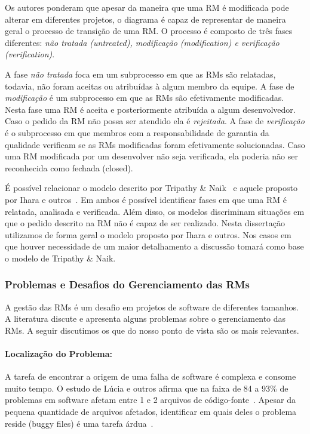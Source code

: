 Os autores ponderam que apesar da maneira que uma RM é modificada pode alterar
em diferentes projetos, o diagrama é capaz de representar de maneira geral o
processo de transição de uma RM\@. O processo é composto de três fases
diferentes: \textit{não tratada (untreated), modificação (modification) e
    verificação (verification)}.

A fase \textit{não tratada} foca em um subprocesso em que as RMs são relatadas,
todavia, não foram aceitas ou atribuídas à algum membro da equipe. A fase de
\textit{modificação} é um subprocesso em que as RMs são efetivamente modificadas.
Nesta fase uma RM é aceita e posteriormente atribuída a algum desenvolvedor.
Caso o pedido da RM não possa ser atendido ela é \textit{rejeitada}.  A fase de
\textit{verificação} é o subprocesso em que membros com a responsabilidade de
garantia da qualidade verificam se as RMs modificadas foram efetivamente
solucionadas. Caso uma RM modificada por um desenvolver não seja verificada, ela
poderia não ser reconhecida como fechada (closed).

É possível relacionar o modelo descrito por Tripathy \&
Naik~\cite{tripathy2014software} e aquele proposto por Ihara e
outros~\cite{ihara2009analysis}. Em ambos é possível identificar fases em que uma
RM é relatada, analisada e verificada. Além disso, os modelos discriminam
situações em que o pedido descrito na RM não é capaz de ser realizado. Nesta
dissertação utilizamos de forma geral o modelo proposto por Ihara e outros. Nos
casos em que houver necessidade de um maior detalhamento a discussão tomará como
base o modelo de Tripathy \& Naik.

\subsubsection{Problemas e Desafios do Gerenciamento das RMs}
\label{ssub:problemas_relacionadas_rm}

A gestão das RMs é um desafio em projetos de software de diferentes tamanhos. A
literatura discute e apresenta alguns problemas sobre o gerenciamento das RMs. A
seguir discutimos os que do nosso ponto de vista são os mais relevantes.

\paragraph{Localização do Problema:}

A tarefa de encontrar a origem de uma falha de software é complexa e consome
muito tempo. O estudo de Lúcia e outros afirma que na faixa de 84 a 93\% de
problemas em software afetam entre 1 e 2 arquivos de
código-fonte~\cite{thung2012faults}. Apesar da pequena quantidade de arquivos
afetados, identificar em quais deles o problema reside (buggy files) é uma
tarefa árdua~\cite{Thung:2014:BIT:2635868.2661678}.

